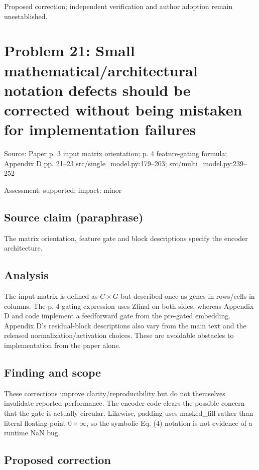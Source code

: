 \documentclass[11pt]{article}
\begin{document}
Proposed correction; independent verification and author adoption remain unestablished.

\section*{Problem 21: Small mathematical/architectural notation defects should be corrected without being mistaken for implementation failures}

Source: Paper p. 3 input matrix orientation; p. 4 feature-gating formula; Appendix D pp. 21–23 src/single\_model.py:179–203; src/multi\_model.py:239–252

Assessment: supported; impact: minor

\subsection*{Source claim (paraphrase)}

The matrix orientation, feature gate and block descriptions specify the encoder architecture.

\subsection*{Analysis}

The input matrix is defined as \(C\times G\) but described once as genes in rows/cells in columns. The p. 4 gating expression uses Zfinal on both sides, whereas Appendix D and code implement a feedforward gate from the pre-gated embedding. Appendix D's residual-block descriptions also vary from the main text and the released normalization/activation choices. These are avoidable obstacles to implementation from the paper alone.

\subsection*{Finding and scope}

These corrections improve clarity/reproducibility but do not themselves invalidate reported performance. The encoder code clears the possible concern that the gate is actually circular. Likewise, padding uses masked\_fill rather than literal floating-point \(0\times\infty\), so the symbolic Eq. (\(4\)) notation is not evidence of a runtime NaN bug.

\subsection*{Proposed correction}
\end{document}
